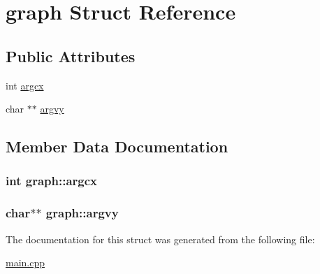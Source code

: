 \hypertarget{structgraph}{\section{graph Struct Reference}
\label{structgraph}
}
\subsection*{Public Attributes}
\begin{DoxyCompactItemize}
\item 
int \hyperlink{structgraph_a572147d5d944bbce5ef7ca058852e5f6}{argcx}
\item 
char $\ast$$\ast$ \hyperlink{structgraph_a15cd4eded4681188bd4ed74a8a960ad1}{argvy}
\end{DoxyCompactItemize}


\subsection{Member Data Documentation}
\hypertarget{structgraph_a572147d5d944bbce5ef7ca058852e5f6}{
\subsubsection[{argcx}]{\setlength{\rightskip}{0pt plus 5cm}int graph\-::argcx}}\label{structgraph_a572147d5d944bbce5ef7ca058852e5f6}
\hypertarget{structgraph_a15cd4eded4681188bd4ed74a8a960ad1}{
\subsubsection[{argvy}]{\setlength{\rightskip}{0pt plus 5cm}char$\ast$$\ast$ graph\-::argvy}}\label{structgraph_a15cd4eded4681188bd4ed74a8a960ad1}


The documentation for this struct was generated from the following file\-:\begin{DoxyCompactItemize}
\item 
\hyperlink{main_8cpp}{main.\-cpp}\end{DoxyCompactItemize}
